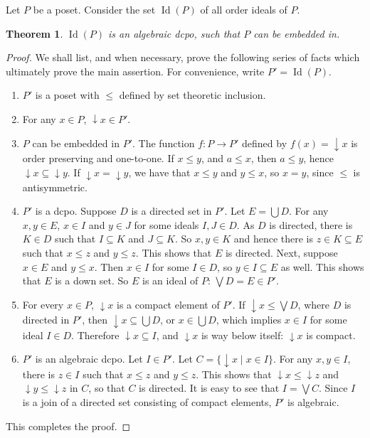 \documentclass[12pt]{article}
\newtheorem{thm}{Theorem}
\newcommand{\down}{\downarrow\!\!}
\begin{document}
Let $P$ be a poset. Consider the set $\operatorname{Id}(P)$ of all order ideals of $P$.

\begin{thm} $\operatorname{Id}(P)$ is an algebraic dcpo, such that $P$ can be embedded in. \end{thm}
\begin{proof}
We shall list, and when necessary, prove the following series of facts which ultimately prove the main assertion.  For convenience, write $P'=\operatorname{Id}(P)$.
\begin{enumerate}
\item $P'$ is a poset with $\le$ defined by set theoretic inclusion.
\item For any $x\in P$, $\down x\in P'$.
\item $P$ can be embedded in $P'$.  The function $f:P\to P'$ defined by $f(x)=\down x$ is order preserving and one-to-one.  If $x\le y$, and $a\le x$, then $a\le y$, hence $\down x\subseteq \down y$.  If $\down x=\down y$, we have that $x\le y$ and $y\le x$, so $x=y$, since $\le$ is antisymmetric.
\item $P'$ is a dcpo.  Suppose $D$ is a directed set in $P'$.  Let $E=\bigcup D$.  For any $x,y\in E$, $x\in I$ and $y\in J$ for some ideals $I,J\in D$.  As $D$ is directed, there is $K\in D$ such that $I\subseteq K$ and $J\subseteq K$.  So $x,y\in K$ and hence there is $z\in K\subseteq E$ such that $x\le z$ and $y\le z$.  This shows that $E$ is directed.  Next, suppose $x\in E$ and $y\le x$.  Then $x\in I$ for some $I\in D$, so $y\in I\subseteq E$ as well.  This shows that $E$ is a down set.  So $E$ is an ideal of $P$: $\bigvee D=E\in P'$.
\item For every $x\in P$, $\down x$ is a compact element of $P'$.  If $\down x\le \bigvee D$, where $D$ is directed in $P'$, then $\down x\subseteq \bigcup D$, or $x\in \bigcup D$, which implies $x\in I$ for some ideal $I\in D$.  Therefore $\down x\subseteq I$, and $\down x$ is way below itself: $\down x$ is compact.
\item $P'$ is an algebraic dcpo.  Let $I\in P'$.  Let $C=\lbrace \down x\mid x\in I\rbrace$.  For any $x,y\in I$, there is $z\in I$ such that $x\le z$ and $y\le z$.  This shows that $\down x\le \down z$ and $\down y\le \down z$ in $C$, so that $C$ is directed.  It is easy to see that $I=\bigvee C$.  Since $I$ is a join of a directed set consisting of compact elements, $P'$ is algebraic.
\end{enumerate}
This completes the proof.
\end{proof}
\end{document}
